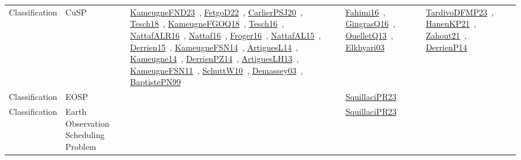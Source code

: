 {\begin{longtable}{lp{3cm}>{\raggedright\arraybackslash}p{6cm}>{\raggedright\arraybackslash}p{6cm}>{\raggedright\arraybackslash}p{8cm}}
\index{CuSP}\index{Classification!CuSP}Classification & CuSP & \href{../works/KameugneFND23.pdf}{KameugneFND23}~\cite{KameugneFND23}, \href{../works/FetgoD22.pdf}{FetgoD22}~\cite{FetgoD22}, \href{../works/CarlierPSJ20.pdf}{CarlierPSJ20}~\cite{CarlierPSJ20}, \href{../works/Tesch18.pdf}{Tesch18}~\cite{Tesch18}, \href{../works/KameugneFGOQ18.pdf}{KameugneFGOQ18}~\cite{KameugneFGOQ18}, \href{../works/Tesch16.pdf}{Tesch16}~\cite{Tesch16}, \href{../works/NattafALR16.pdf}{NattafALR16}~\cite{NattafALR16}, \href{../works/Nattaf16.pdf}{Nattaf16}~\cite{Nattaf16}, \href{../works/Froger16.pdf}{Froger16}~\cite{Froger16}, \href{../works/NattafAL15.pdf}{NattafAL15}~\cite{NattafAL15}, \href{../works/Derrien15.pdf}{Derrien15}~\cite{Derrien15}, \href{../works/KameugneFSN14.pdf}{KameugneFSN14}~\cite{KameugneFSN14}, \href{../works/ArtiguesL14.pdf}{ArtiguesL14}~\cite{ArtiguesL14}, \href{../works/Kameugne14.pdf}{Kameugne14}~\cite{Kameugne14}, \href{../works/DerrienPZ14.pdf}{DerrienPZ14}~\cite{DerrienPZ14}, \href{../works/ArtiguesLH13.pdf}{ArtiguesLH13}~\cite{ArtiguesLH13}, \href{../works/KameugneFSN11.pdf}{KameugneFSN11}~\cite{KameugneFSN11}, \href{../works/SchuttW10.pdf}{SchuttW10}~\cite{SchuttW10}, \href{../works/Demassey03.pdf}{Demassey03}~\cite{Demassey03}, \href{../works/BaptistePN99.pdf}{BaptistePN99}~\cite{BaptistePN99} & \href{../works/Fahimi16.pdf}{Fahimi16}~\cite{Fahimi16}, \href{../works/GingrasQ16.pdf}{GingrasQ16}~\cite{GingrasQ16}, \href{../works/OuelletQ13.pdf}{OuelletQ13}~\cite{OuelletQ13}, \href{../works/Elkhyari03.pdf}{Elkhyari03}~\cite{Elkhyari03} & \href{../works/TardivoDFMP23.pdf}{TardivoDFMP23}~\cite{TardivoDFMP23}, \href{../works/HanenKP21.pdf}{HanenKP21}~\cite{HanenKP21}, \href{../works/Zahout21.pdf}{Zahout21}~\cite{Zahout21}, \href{../works/DerrienP14.pdf}{DerrienP14}~\cite{DerrienP14}\\
\index{EOSP}\index{Classification!EOSP}Classification & EOSP &  & \href{../works/SquillaciPR23.pdf}{SquillaciPR23}~\cite{SquillaciPR23} & \\
\index{Earth Observation Scheduling Problem}\index{Classification!Earth Observation Scheduling Problem}Classification & Earth Observation Scheduling Problem &  & \href{../works/SquillaciPR23.pdf}{SquillaciPR23}~\cite{SquillaciPR23} & \\

\end{longtable}}
